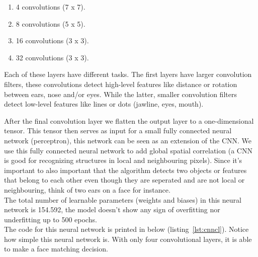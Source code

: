 \begin{enumerate}
  \item 4 convolutions (7 x 7).
  \item 8 convolutions (5 x 5).
  \item 16 convolutions (3 x 3).
  \item 32 convolutions (3 x 3).
\end{enumerate}

Each of these layers have different tasks. The first layers have larger convolution filters, these convolutions detect high-level features like distance or rotation between ears, nose and/or eyes. While the latter, smaller convolution filters detect low-level features like lines or dots (jawline, eyes, mouth).

After the final convolution layer we flatten the output layer to a one-dimensional tensor. This tensor then serves as input for a small fully connected neural network (perceptron), this network can be seen as an extension of the CNN. We use this fully connected neural network to add global spatial correlation (a CNN is good for recognizing structures in local and neighbouring pixels). Since it's important to also important that the algorithm detects two objects or features that belong to each other even though they are seperated and are not local or neighbouring, think of two ears on a face for instance.\\

The total number of learnable parameters (weights and biases) in this neural network is 154.592, the model doesn't show any sign of overfitting nor underfitting up to 500 epochs.\\

The code for this neural network is printed in below (listing~\ref{lst:cnncl}). Notice how simple this neural network is. With only four convolutional layers, it is able to make a face matching decision.

